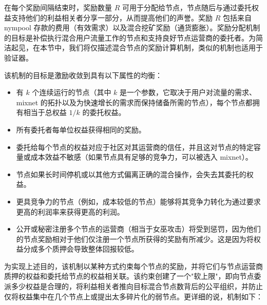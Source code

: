 \documentclass{article}
\begin{document}
	在每个奖励间隔结束时，奖励数量 $R$ 可用于分配给节点，节点随后与通过委托权益支持他们的利益相关者分享一部分，从而提高他们的声誉。奖励 $R$ 包括来自 nympool 存款的费用（有效需求）以及混合挖矿奖励（通货膨胀）。奖励分配机制的目标是补偿执行混合用户流量工作的节点和支持良好节点运营商的委托者。为简洁起见，在本节中，我们将仅描述混合节点的奖励计算机制，类似的机制也适用于验证器。\newline

	该机制的目标是激励收敛到具有以下属性的均衡：
	
\begin{itemize}
\item 有 $k$ 个连续运行的节点（其中 $k$ 是一个参数，它取决于用户对流量的需求、mixnet 的拓扑以及为快速增长的需求而保持储备所需的节点），每个节点都拥有相当于总权益 $1/k$ 的委托权益。
\item 所有委托者每单位权益获得相同的奖励。
\item 委托给每个节点的权益对应于社区对其运营商的信任，并且这对节点的特定容量或成本效益不敏感（如果节点具有足够的竞争力，可以被选入 mixnet）。
\item 节点如果长时间停机或以其他方式偏离正确的混合操作，会失去其委托的权益。
\item 更具竞争力的节点（例如，成本较低的节点）能够将其竞争力转化为通过要求更高的利润率来获得更高的利润。
\item 公开或秘密注册多个节点的运营商（相当于女巫攻击）将受到惩罚，因为他们的节点奖励相对于他们仅注册一个节点所获得的奖励有所减少。这是因为将权益分成多个质押会导致整体回报较低。
\end{itemize}

	为实现上述目的，该机制以某种方式约束每个节点的奖励，并将它们与节点运营商质押的权益和委托给节点的权益相关联。该约束创建了一个"软上限"，即向节点委派多少权益是合理的，将利益相关者推向目标混合节点数背后的公平组织，并防止仅将权益集中在几个节点上或提出太多碎片化的弱节点。更详细的说，机制如下：
	
\end{document}
